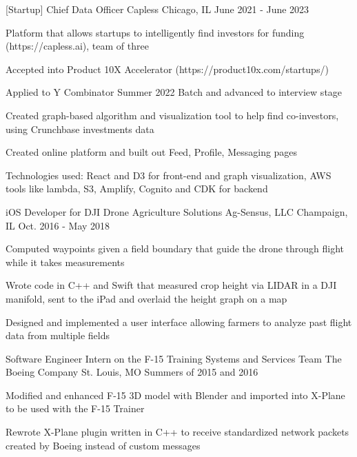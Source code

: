 \begin{cventries}
  \cventry
    {[Startup] Chief Data Officer} %
    {Capless} %
    {Chicago, IL} %
    {June 2021 - June 2023} %
    {
      \begin{cvitems} %
        \item {Platform that allows startups to intelligently find investors for funding (https://capless.ai), team of three}
        \item {Accepted into Product 10X Accelerator (https://product10x.com/startups/)}
        \item {Applied to Y Combinator Summer 2022 Batch and advanced to interview stage}
        \item {Created graph-based algorithm and visualization tool to help find co-investors, using Crunchbase investments data}
        \item {Created online platform and built out Feed, Profile, Messaging pages}
        \item {Technologies used: React and D3 for front-end and graph visualization, AWS tools like lambda, S3, Amplify, Cognito and CDK for backend }
      \end{cvitems}
    }

  \cventry
    {iOS Developer for DJI Drone Agriculture Solutions} %
    {Ag-Sensus, LLC} %
    {Champaign, IL} %
    {Oct. 2016 - May 2018} %
    {
      \begin{cvitems} %
        \item {Computed waypoints given a field boundary that guide the drone through flight while it takes measurements}
        \item {Wrote code in C++ and Swift that measured crop height via LIDAR in a DJI manifold, sent to the iPad and overlaid the height graph on a map}
        \item {Designed and implemented a user interface allowing farmers to analyze past flight data from multiple fields}
      \end{cvitems}
    }

  \cventry
    {Software Engineer Intern on the F-15 Training Systems and Services Team} %
    {The Boeing Company} %
    {St. Louis, MO} %
    {Summers of 2015 and 2016} %
    {
      \begin{cvitems} %
        \item {Modified and enhanced F-15 3D model with Blender and imported into X-Plane to be used with the F-15 Trainer}
        \item {Rewrote X-Plane plugin written in C++ to receive standardized network packets created by Boeing instead of custom messages}
      \end{cvitems}
    }

\end{cventries}
